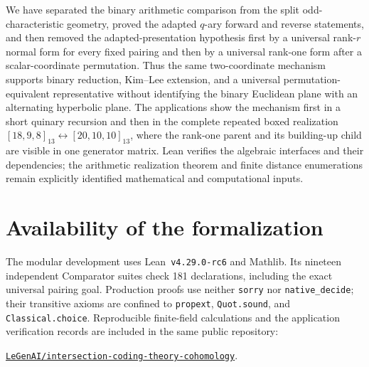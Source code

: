 \documentclass[12pt]{article}
\begin{document}
We have separated the binary arithmetic comparison from the split
odd-characteristic geometry, proved the adapted \(q\)-ary forward and reverse
statements, and then removed the adapted-presentation hypothesis first by a
universal rank-\(r\) normal form for every fixed pairing and then by a
universal rank-one form after a scalar-coordinate permutation.  Thus the same two-coordinate mechanism
supports binary reduction, Kim--Lee extension, and a universal
permutation-equivalent representative without identifying the binary
Euclidean plane with an alternating hyperbolic plane.  The applications show
the mechanism first in a short quinary recursion and then in the complete
repeated boxed realization
\([18,9,8]_{13}\leftrightarrow[20,10,10]_{13}\), where the rank-one parent
and its building-up child are visible in one generator matrix.  Lean verifies
the algebraic interfaces and their dependencies; the arithmetic realization
theorem and finite distance enumerations remain explicitly identified
mathematical and computational inputs.


\section*{Availability of the formalization}

The modular development uses Lean~\texttt{v4.29.0-rc6} and Mathlib.  Its
nineteen independent Comparator suites check 181 declarations, including
the exact universal pairing goal.  Production proofs use neither
\texttt{sorry} nor \texttt{native\_decide}; their transitive axioms are
confined to \texttt{propext}, \texttt{Quot.sound}, and
\texttt{Classical.choice}.  Reproducible finite-field calculations and the
application verification records are included in the same public repository:
\begin{center}
\href{https://github.com/LeGenAI/intersection-coding-theory-cohomology}
{\texttt{LeGenAI/intersection-coding-theory-cohomology}}.
\end{center}
\end{document}
